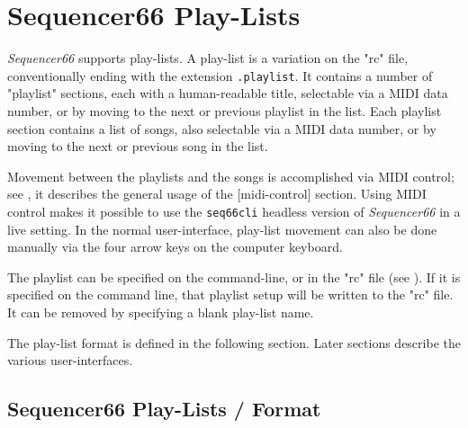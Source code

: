 %
%
%

\section{Sequencer66 Play-Lists}
\label{sec:playlist}

   \textsl{Sequencer66} supports play-lists.
   A play-list is a variation on the "rc" file, conventionally ending with the
   extension \texttt{.playlist}.  It contains a number of "playlist" sections,
   each with a human-readable title, selectable via a MIDI data number,
   or by moving to the next or previous playlist in the list.
   Each playlist section contains a list of songs, also selectable via a MIDI
   data number, or by moving to the next or previous song in the list.

   Movement between the playlists and the songs is accomplished via 
   MIDI control; see
   ,
   it describes the general usage of the [midi-control] section.
   Using MIDI control makes it possible to use the \texttt{seq66cli}
   headless version of \textsl{Sequencer66} in a live setting.
   In the normal user-interface, play-list movement
   can also be done manually via the four arrow keys on the computer
   keyboard.

   The playlist can be specified on the command-line, or in
   the "rc" file (see ).
   If it is specified on the command line, that playlist setup will
   be written to the "rc" file.  It can be removed by specifying a blank
   play-list name.

   The play-list format is defined in the following section.
   Later sections describe the various user-interfaces.

\subsection{Sequencer66 Play-Lists / Format}
\label{subsec:playlist_setup}

